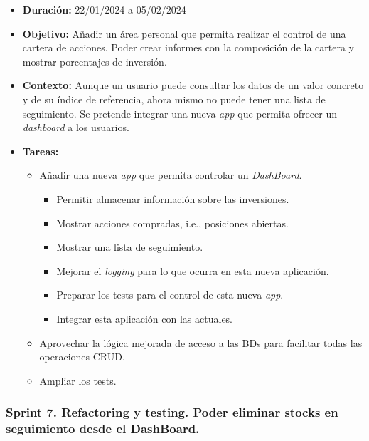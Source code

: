 \begin{itemize}
\item  
\textbf{Duración:} 22/01/2024 a 05/02/2024

\item
\textbf{Objetivo:} Añadir un área personal que permita realizar el control de una cartera de acciones. Poder crear informes con la composición de la cartera y mostrar porcentajes de inversión.   

\item
\textbf{Contexto:} Aunque un usuario puede consultar los datos de un valor concreto y de su índice de referencia, ahora mismo no puede tener una lista de seguimiento. Se pretende integrar una nueva \emph{app} que permita ofrecer un \emph{dashboard} a los usuarios. 

\item
\textbf{Tareas:}
	\begin{itemize}
	\tightlist
	\item 
	Añadir una nueva \emph{app} que permita controlar un \emph{DashBoard}. 
		\begin{itemize}
		\tightlist
		\item
		Permitir almacenar información sobre las inversiones. 
		\item
		Mostrar acciones compradas, i.e., posiciones abiertas.
		\item
		Mostrar una lista de seguimiento. 
		\item
		Mejorar el \emph{logging} para lo que ocurra en esta nueva aplicación.
		\item
		Preparar los tests para el control de esta nueva \emph{app}. 
		\item
		Integrar esta aplicación con las actuales. 
		\end{itemize}
	\item
	Aprovechar la lógica mejorada de acceso a las BDs para facilitar todas las operaciones CRUD. 
	\item 	
	Ampliar los tests.
  	\end{itemize}
\end{itemize}


\subsubsection{Sprint 7. Refactoring y testing. Poder eliminar stocks en seguimiento desde el DashBoard.}


